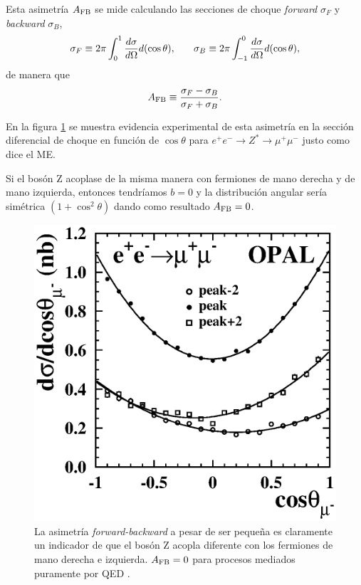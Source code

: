 \begin{itemize}
Esta asimetría $A_{\rm FB}$ se mide calculando las secciones de choque \textit{forward} $\sigma_F$ y  \textit{backward} $\sigma_B$,
\begin{equation}
\sigma_F \equiv 2 \pi \int_0^1 \frac{d\sigma}{d \Omega} d(\cos \theta ), \hspace{0.25in} \sigma_B \equiv 2 \pi \int_{-1}^0 \frac{d\sigma}{d \Omega} d(\cos \theta ),
\end{equation}
de manera que
\begin{equation}
A_{\rm FB} \equiv \frac{\sigma_F - \sigma_B}{\sigma_F + \sigma_B}.
\end{equation}

En la figura \ref{SMt5} se muestra evidencia experimental de esta asimetría en la sección diferencial de choque en función de $\cos \theta$ para $e^+e^- \to Z^* \to \mu^+ \mu^-$ justo como dice el ME.

Si el bosón Z acoplase de la misma manera con fermiones de mano derecha y de mano izquierda, entonces tendríamos $b=0$ y la distribución angular sería simétrica $(1+\cos^2\theta)$ dando como resultado $A_{\rm FB} = 0$.


\end{itemize}



\begin{figure}[h!]
\centering
\includegraphics[scale=0.5]{Images/SM-test-5.eps}
  \caption[Asimetría forward-backward]{La asimetría \textit{forward-backward} a pesar de ser pequeña es claramente un indicador de que el bosón Z acopla diferente con los fermiones de mano derecha e izquierda. $A_{\rm FB}=0$ para procesos mediados puramente por QED  \cite{opal2001precise}.}
 \label{SMt5}
\end{figure}



